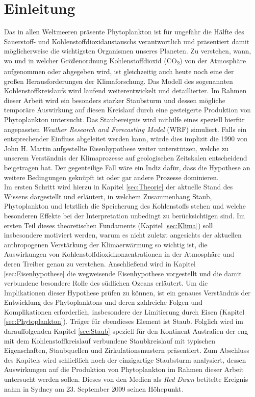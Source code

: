 \documentclass[12pt,a4paper,onecolumn,draft]{scrartcl}
\newcommand{\cotwo}{CO\textsubscript{2}}
\begin{document}
\section{Einleitung} \label{sec:einleitung}
Das in allen Weltmeeren präsente Phytoplankton ist für ungefähr die Hälfte des Sauerstoff- und Kohlenstoffdioxidaustauschs verantwortlich \citep{Emerson.2009} und präsentiert damit möglicherweise die wichtigsten Organismen unseres Planeten. Zu verstehen, wann, wo und in welcher Größenordnung Kohlenstoffdioxid (\cotwo) von der Atmosphäre aufgenommen oder abgegeben wird, ist gleichzeitig auch heute noch eine der großen Herausforderungen der Klimaforschung. Das Modell des sogenannten Kohlenstoffkreislaufs wird laufend weiterentwickelt und detaillierter. Im Rahmen dieser Arbeit wird ein besonders starker Staubsturm und dessen mögliche temporäre Auswirkung auf diesen Kreislauf durch eine gesteigerte Produktion von Phytoplankton untersucht. Das Staubereignis wird mithilfe eines speziell hierfür angepassten \textit{Weather Research and Forecasting Model} (WRF) simuliert. Falls ein entsprechender Einfluss abgeleitet werden kann, würde dies implizit die 1990 von John H. Martin aufgestellte Eisenhypothese weiter unterstützen, welche zu unserem Verständnis der Klimaprozesse auf geologischen Zeitskalen entscheidend beigetragen hat. Der gegenteilige Fall wäre ein Indiz dafür, dass die Hypothese an weitere Bedingungen geknüpft ist oder gar andere Prozesse dominieren.  \\

Im ersten Schritt wird hierzu in Kapitel \ref{sec:Theorie} der aktuelle Stand des Wissens dargestellt und erläutert, in welchem Zusammenhang Staub, Phytoplankton und letztlich die Speicherung des Kohlenstoffs stehen und welche besonderen Effekte bei der Interpretation unbedingt zu berücksichtigen sind.  Im ersten Teil dieses theoretischen Fundaments (Kapitel  \ref{sec:Klima}) soll insbesondere motiviert werden, warum es nicht zuletzt angesichts der aktuellen anthropogenen Verstärkung der Klimaerwärmung so wichtig ist, die Auswirkungen von Kohlenstoffdioxidkonzentrationen in der Atmosphäre und deren Treiber genau zu verstehen. Anschließend wird in Kapitel \ref{sec:Eisenhypothese} die wegweisende Eisenhypothese \citep{Martin.1990} vorgestellt und die damit verbundene besondere Rolle des südlichen Ozeans erläutert. Um die Implikationen dieser Hypothese prüfen zu können, ist ein genaues Verständnis der Entwicklung des Phytoplanktons und deren zahlreiche Folgen und Komplikationen erforderlich, insbesondere der Limitierung durch Eisen  (Kapitel \ref{sec:Phytoplankton}). Träger für ebendieses Element ist Staub. Folglich wird im darauffolgenden Kapitel \ref{sec:Staub} speziell für den Kontinent Australien der eng mit dem Kohlenstoffkreislauf verbundene Staubkreislauf mit typischen Eigenschaften, Staubquellen und Zirkulationsmustern  präsentiert. Zum Abschluss des Kapitels wird schließlich noch der einzigartige Staubsturm analysiert, dessen Auswirkungen auf die Produktion von Phytoplankton im Rahmen dieser Arbeit untersucht werden sollen. Dieses von den Medien als \textit{Red Dawn} betitelte Ereignis nahm in Sydney am 23. September 2009 seinen Höhepunkt. \\
\end{document}
